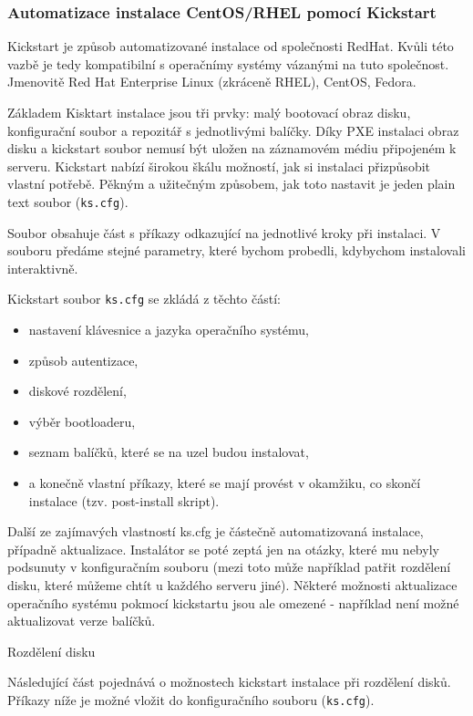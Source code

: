 \documentclass[thesis=B,czech]{FITthesis}[2012/06/26]
\begin{document}
\subsubsection{Automatizace instalace CentOS/RHEL pomocí Kickstart}

Kickstart je způsob automatizované instalace od společnosti RedHat. Kvůli této vazbě je tedy kompatibilní s operačnímy systémy vázanými na tuto společnost. Jmenovitě Red Hat Enterprise Linux (zkráceně RHEL), CentOS, Fedora.

Základem Kisktart instalace jsou tři prvky: malý bootovací obraz disku, konfigurační soubor a repozitář s jednotlivými balíčky. Díky PXE instalaci obraz disku a kickstart soubor nemusí být  uložen na záznamovém médiu připojeném k serveru. Kickstart nabízí širokou škálu možností, jak si instalaci přizpůsobit vlastní potřebě. Pěkným a užitečným způsobem, jak toto nastavit je jeden plain text soubor (\texttt{ks.cfg}).

Soubor obsahuje část s příkazy odkazující na jednotlivé kroky při instalaci. V souboru předáme stejné parametry, které bychom probedli, kdybychom instalovali interaktivně. 

Kickstart soubor \texttt{ks.cfg} se zkládá z těchto částí:

\begin{itemize}

\item nastavení klávesnice a jazyka operačního systému,
\item způsob autentizace,
\item diskové rozdělení,
\item výběr bootloaderu,
\item seznam balíčků, které se na uzel budou instalovat,
\item a konečně vlastní příkazy, které se mají provést v okamžiku, co skončí instalace (tzv. post-install skript).
\end{itemize}

Další ze zajímavých vlastností ks.cfg je částečně automatizovaná instalace, případně aktualizace. Instalátor se poté zeptá jen na otázky, které mu nebyly podsunuty v konfiguračním souboru (mezi toto může například patřit rozdělení disku, které můžeme chtít u každého serveru jiné). Některé možnosti aktualizace operačního systému pokmocí kickstartu jsou ale omezené - například není možné aktualizovat verze balíčků. 

Rozdělení disku

Následující část pojednává o možnostech kickstart instalace při rozdělení disků. Příkazy níže je možné vložit do konfiguračního souboru (\texttt{ks.cfg}).
\end{document}
